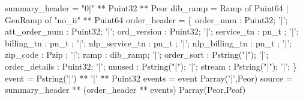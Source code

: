  summary\_header = "0|" ** Puint32 ** Peor
\mbox{}
 dib\_ramp = 
  Ramp of Puint64 
| GenRamp of "no\_ii" ** Puint64
\mbox{}
 order\_header = \{
       order\_num       : Puint32;
 '|';  att\_order\_num  : Puint32;             
 '|';  ord\_version     : Puint32;         
 '|';  service\_tn      : pn\_t ;
 '|';  billing\_tn      : pn\_t ;          
 '|';  nlp\_service\_tn : pn\_t ;
 '|';  nlp\_billing\_tn : pn\_t ;
 '|';  zip\_code        : Pzip ;
 '|';  ramp             : dib\_ramp; 
 '|';  order\_sort      : Pstring("|");
 '|';  order\_details   : Puint32;             
 '|';  unused           : Pstring("|");
 '|';  stream           : Pstring("|");
 '|';
\}
\mbox{}
 event  = Pstring('|') **  '|' ** Puint32
\mbox{}
 events = event Parray('|',Peor)
\mbox{}
 source = summary\_header ** (order\_header ** events) Parray(Peor,Peof)
